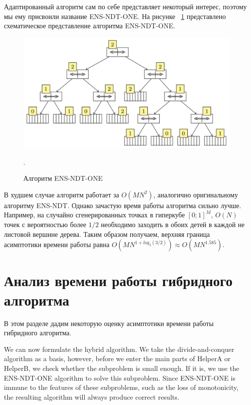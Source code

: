 Адаптированный алгоритм сам по себе представляет некоторый интерес, поэтому мы ему присвоили название ENS-NDT-ONE. На рисунке ~\ref{ndtree_new} представлено схематическое представление алгоритма ENS-NDT-ONE.

\begin{figure}[!h]
\begin{center}
\includegraphics[width=15cm]{pic/ndtree_new.png}
\caption{Алгоритм ENS-NDT-ONE}.
\label{ndtree_new}
\end{center}
\end{figure}

В худшем случае алгоритм работает за $O(MN^2)$, аналогично оригинальному алгоритму ENS-NDT. Однако зачастую время работы алгоритма сильно лучше. Например, на случайно сгенерированных точках в гиперкубе $[0; 1]^M$, $O(N)$ точек с вероятностью более $1/2$ необходимо заходить в обоих детей в каждой не листовой вершине дерева. Таким образом получаем, верхняя граница асимптотики времени работы равна $O(MN^{1+log_2(3/2)}) \approx O(MN^{1.585})$.

\section{Анализ времени работы гибридного алгоритма}

В этом разделе дадим некоторую оценку асимптотики времени работы гибридного алгоритма.

We can now formulate the hybrid algorithm. We take the divide-and-conquer algorithm as a basis, however, before we enter the main parts of HelperA or HelperB, we check whether the subproblem is small enough. If it is, we use the ENS-NDT-ONE algorithm to solve this subproblem. Since ENS-NDT-ONE is immune to the features of these subproblems, such as the loss of monotonicity, the resulting algorithm will always produce correct results.

